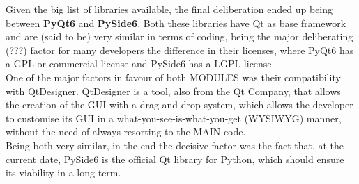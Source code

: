 Given the big list of libraries available, the final deliberation ended up being between \textbf{PyQt6} and \textbf{PySide6}. Both these libraries have Qt as base framework and are (said to be) very similar in terms of coding, being the major deliberating (???) factor for many developers the difference in their licenses, where PyQt6 has a GPL or commercial license and PySide6 has a LGPL license. \\
	One of the major factors in favour of both MODULES was their compatibility with QtDesigner. QtDesigner is a tool, also from the Qt Company, that allows the creation of the GUI with a drag-and-drop system, which allows the developer to customise its GUI in a what-you-see-is-what-you-get (WYSIWYG) manner, without the need of always resorting to the MAIN code.\\
Being both very similar, in the end the decisive factor was the fact that, at the current date, PySide6 is the official Qt library for Python, which should ensure its viability in a long term.










